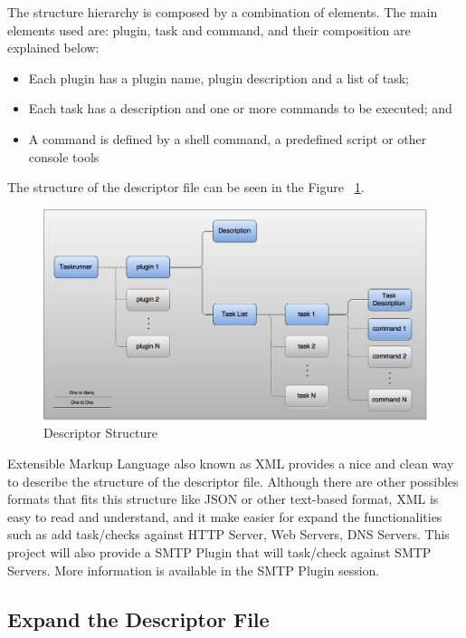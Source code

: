 \documentclass[a4paper, 12pt]{article}
\begin{document}
	The structure hierarchy is composed by a combination of elements. The main elements used are: plugin, task and command, and their composition are
explained below:

\begin{itemize}
\item Each plugin has a plugin name, plugin description and a list of task;
\item Each task has a description and one or more commands to be executed; and
\item A command is defined by a shell command, a predefined script or other console tools
\end{itemize}

\noindent
The structure of the descriptor file can be seen in the Figure ~\ref{img:diagram}.

\noindent
\begin{figure}
	\centering
	\includegraphics[width=\textwidth]{images/diagram.png}
	\caption{Descriptor Structure}
	\label{img:diagram}
\end{figure}

	Extensible Markup Language also known as XML provides a nice and clean way to describe the structure of the descriptor file. Although there are other
possibles formats that fits this structure like JSON or other text-based format, XML is easy to read and understand, and it make easier for expand the
functionalities such as add task/checks against HTTP Server, Web Servers, DNS Servers. This project will also provide a SMTP Plugin that will task/check
against SMTP Servers. More information is available in the SMTP Plugin session.\\

\subsection{Expand the Descriptor File}
\end{document}
